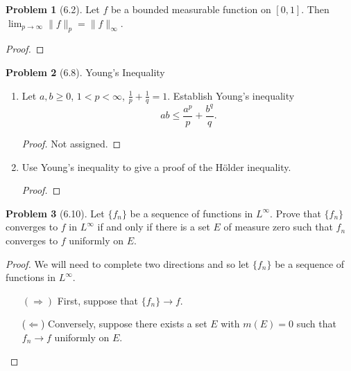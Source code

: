 \documentclass[12pt]{article}
\theoremstyle{definition}
\newtheorem{problem}{Problem}
\begin{document}
\begin{problem}[6.2]
    Let \( f \) be a bounded measurable function on \( [0, 1] \). Then
    \( \displaystyle \lim_{p \to \infty} \lVert f \rVert_{p} = \lVert f \rVert_{\infty} \).

        \begin{proof}
            
        \end{proof}
\end{problem}


\begin{problem}[6.8] Young's Inequality

    \begin{enumerate}[label = (\alph{*})]
        \item Let \( a, b \geq 0 \), \( 1 < p < \infty \), \( \displaystyle \frac{1}{p} + \frac{1}{q} = 1 \). Establish Young's inequality 
            \[
                ab \leq \frac{a^p}{p} + \frac{b^q}{q}.
            \]
            \begin{proof}
                Not assigned. 
            \end{proof}
        \item Use Young's inequality to give a proof of the H\"{o}lder inequality.
            \begin{proof}
                
            \end{proof}
    \end{enumerate}
    
\end{problem}


\begin{problem}[6.10]
    Let \( \{f_n\} \) be a sequence of functions in \( L^{\infty} \). Prove that \( \{f_n\} \) converges to \( f \) in \( L^{\infty} \) 
    if and only if there is a set \( E \) of measure zero such that \( f_n \) converges to \( f \) uniformly on \( E \).

        \begin{proof}
            We will need to complete two directions and so let \( \{f_n\} \) be a sequence of functions in \( L^{\infty} \).  
                \begin{enumerate}
                    \item[\((\Rightarrow)\)] First, suppose that \( \{f_n\} \to f \).
                    \item[(\(\Leftarrow\))] Conversely, suppose there exists a set \( E \) with \( m(E) = 0 \) such that \( f_n \to f \) uniformly on \( E \).
                \end{enumerate}
        \end{proof}

\end{problem}
\end{document}
